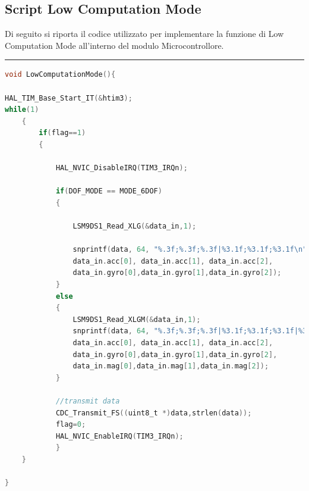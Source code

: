 \subsection{Script Low Computation Mode}
\label{app:lcm}
Di seguito si riporta il codice utilizzato per implementare la funzione di Low Computation Mode all'interno del modulo Microcontrollore.\\
\noindent\rule{14.1cm}{0.4pt}
\begin{lstlisting}[language=C]
void LowComputationMode(){

HAL_TIM_Base_Start_IT(&htim3);
while(1)
	{
		if(flag==1)
		{

			HAL_NVIC_DisableIRQ(TIM3_IRQn);

			if(DOF_MODE == MODE_6DOF)
			{

				LSM9DS1_Read_XLG(&data_in,1);

				snprintf(data, 64, "%.3f;%.3f;%.3f|%3.1f;%3.1f;%3.1f\n",
				data_in.acc[0], data_in.acc[1], data_in.acc[2],
				data_in.gyro[0],data_in.gyro[1],data_in.gyro[2]);
			}
			else
			{
				LSM9DS1_Read_XLGM(&data_in,1);
				snprintf(data, 64, "%.3f;%.3f;%.3f|%3.1f;%3.1f;%3.1f|%3.1f;%3.1f;%3.1f\n",
				data_in.acc[0], data_in.acc[1], data_in.acc[2],
				data_in.gyro[0],data_in.gyro[1],data_in.gyro[2],
				data_in.mag[0],data_in.mag[1],data_in.mag[2]);
			}

			//transmit data
			CDC_Transmit_FS((uint8_t *)data,strlen(data));
			flag=0;
			HAL_NVIC_EnableIRQ(TIM3_IRQn);
			}
	}

}



\end{lstlisting}


